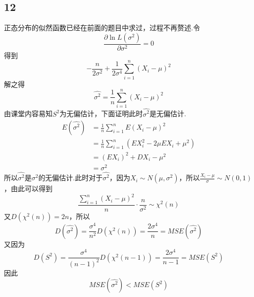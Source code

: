 \documentclass[twocolumn]{article}
\begin{document}
\begin{CJK}{UTF8}{gbsn}
			\subsection*{12}
				正态分布的似然函数已经在前面的题目中求过，过程不再赘述.令\[\frac{\partial \ln L(\sigma^2)}{\partial\sigma^2}=0\]得到\[-\frac{n}{2\sigma^2}+\frac{1}{2\sigma^4}\sum_{i=1}^{n}(X_i-\mu)^2\]解之得\[\hat{\sigma^2}=\frac{1}{n}\sum_{i=1}^{n}(X_i-\mu)^2\]由课堂内容易知$S^2$为无偏估计，下面证明此时$\hat{\sigma^2}$是无偏估计.\begin{align*}
					E(\hat{\sigma^2}) & = \frac{1}{n}\sum_{i=1}^{n}E(X_i-\mu)^2\\
					& = \frac{1}{n}\sum_{i=1}^{n}(EX_i^2-2\mu EX_i+\mu^2)\\
					& = (EX_i)^2+DX_i-\mu^2\\
					& = \sigma^2
				\end{align*}
				所以$\hat{\sigma^2}$是$\sigma^2$的无偏估计.此时对于$\hat{\sigma^2}$，因为$X_i\sim N(\mu,\sigma^2)$，所以$\frac{X_i-\mu}{\sigma}\sim N(0,1)$，由此可以得到\[\frac{\sum_{i=1}^{n}(X_i-\mu)^2}{n}\cdot\frac{n}{\sigma^2}\sim \chi^2(n)\]又$D(\chi^2(n))=2n$，所以\[D(\hat{\sigma^2})=\frac{\sigma^4}{n^2}D(\chi^2(n))=\frac{2\sigma^4}{n}=MSE(\hat{\sigma^2})\]又因为\[D(S^2)=\frac{\sigma^4}{(n-1)^2}D(\chi^2(n-1))=\frac{2\sigma^4}{n-1}=MSE(S^2)\]因此\[MSE(\hat{\sigma^2})<MSE(S^2)\]
			
	\end{CJK}
\end{document}
